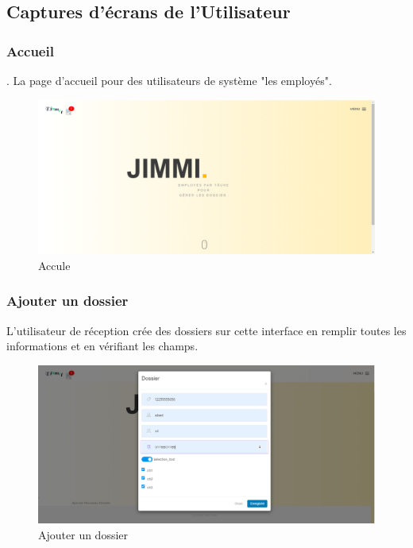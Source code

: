  

 \subsection{Captures d'écrans de l'Utilisateur }
\subsubsection{ Accueil  }.
La page d'accueil pour des utilisateurs de système "les employés".
\begin{figure}
	\centering
	\includegraphics[width=1\linewidth]{images/captures/capturesuser/home}
	\caption{Accule}
	\label{fig:home}
\end{figure} 




\subsubsection{Ajouter un dossier}

L'utilisateur de réception crée des dossiers sur cette interface en remplir toutes les informations et en vérifiant les champs.
\begin{figure}[H]
	\centering
	\includegraphics[width=1\linewidth]{images/captures/capturesuser/adddossier}
	\caption{Ajouter un dossier}
	\label{fig:adddossier}
\end{figure}



